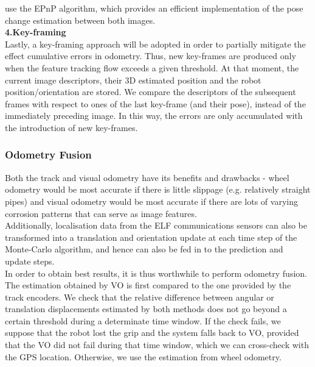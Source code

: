 \documentclass[11pt]{article}		%
\begin{document}
use the EPnP algorithm, which provides an efficient implementation of the pose change estimation
between both images.
\\\textbf{4.Key-framing}
\\Lastly, a key-framing approach will be adopted in order to partially mitigate the effect cumulative errors in odometry. Thus, new key-frames are produced only when the feature tracking flow exceeds a given threshold. At that moment, the current image descriptors, their 3D estimated
position and the robot position/orientation are stored. We compare the descriptors of the subsequent
frames with respect to ones of the last key-frame (and their pose), instead of the immediately preceding
image. In this way, the errors are only accumulated with the introduction of new key-frames.
	\subsubsection{Odometry Fusion}
	Both the track and visual odometry have its benefits and drawbacks - wheel odometry would be most accurate if there is little slippage (e.g. relatively straight pipes) and visual odometry would be most accurate if there are lots of varying corrosion patterns that can serve as image features. 
	\\ \hspace*{3ex}Additionally, localisation data from the ELF communications sensors can also be transformed into a translation and orientation update at each time step of the Monte-Carlo algorithm, and hence can also be fed in to the prediction and update steps.
	\\ \hspace*{3ex}In order to obtain best results, it is thus worthwhile to perform odometry fusion. The estimation obtained by VO is first compared to the one provided by the track encoders. We check that the relative difference between angular or translation displacements estimated by both methods does not go beyond a certain threshold during a determinate time window. If the check fails, we suppose that the robot lost the grip and the system falls back to VO, provided that the VO did not fail during that time window, which we can cross-check with the GPS location. Otherwise, we use the estimation from wheel odometry.
	
\end{document}
